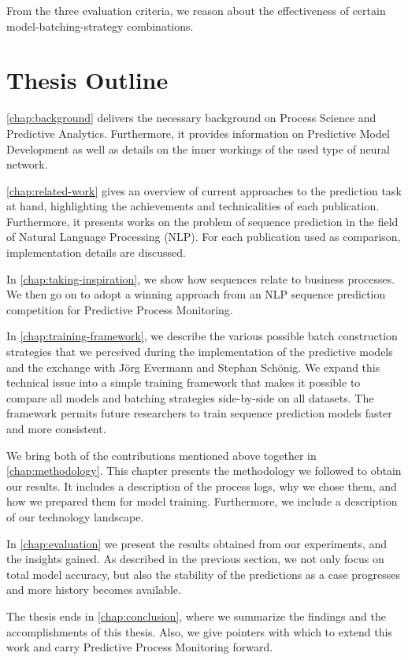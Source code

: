 From the three evaluation criteria, we reason about the effectiveness of certain model-batching-strategy combinations.

\section{Thesis Outline}\label{sec:intro:outline}
\autoref{chap:background} delivers the necessary background on Process Science and Predictive Analytics. Furthermore, it provides information on Predictive Model Development as well as details on the inner workings of the used type of neural network.

\autoref{chap:related-work} gives an overview of current approaches to the prediction task at hand, highlighting the achievements and technicalities of each publication. Furthermore, it presents works on the problem of sequence prediction in the field of Natural Language Processing (NLP). For each publication used as comparison, implementation details are discussed.

In \autoref{chap:taking-inspiration}, we show how sequences relate to business processes.
We then go on to adopt a winning approach from an NLP sequence prediction competition for Predictive Process Monitoring.

In \autoref{chap:training-framework}, we describe the various possible batch construction strategies that we perceived during the implementation of the predictive models and the exchange with Jörg Evermann and Stephan Schönig. We expand this technical issue into a simple training framework that makes it possible to compare all models and batching strategies side-by-side on all datasets. The framework permits future researchers to train sequence prediction models faster and more consistent.

We bring both of the contributions mentioned above together in \autoref{chap:methodology}.
This chapter presents the methodology we followed to obtain our results.
It includes a description of the process logs, why we chose them, and how we prepared them for model training.
Furthermore, we include a description of our technology landscape.

In \autoref{chap:evaluation} we present the results obtained from our experiments, and the insights gained. As described in the previous section, we not only focus on total model accuracy, but also the stability of the predictions as a case progresses and more history becomes available.

The thesis ends in \autoref{chap:conclusion}, where we summarize the findings and the accomplishments of this thesis. Also, we give pointers with which to extend this work and carry Predictive Process Monitoring forward.
